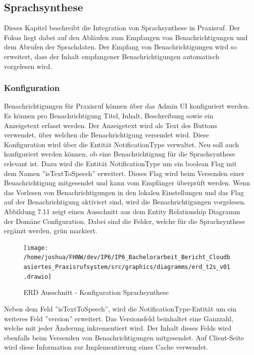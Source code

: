 \subsection{Sprachsynthese}

Dieses Kapitel beschreibt die Integration von Sprachsynthese in Praxisruf.
Der Fokus liegt dabei auf den Abläufen zum Empfangen von Benachrichtigungen und dem Abrufen der Sprachdaten.
Der Empfang von Benachrichtigungen wird so erweitert, dass der Inhalt empfangener Benachrichtigungen automatisch vorgelesen wird.

\subsubsection{Konfiguration}

Benachrichtigungen für Praxisruf können über das Admin UI konfiguriert werden.
Es können pro Benachrichtigung Titel, Inhalt, Beschreibung sowie ein Anzeigetext erfasst werden.
Der Anzeigetext wird als Text des Buttons verwendet, über welchen die Benachrichtigung versendet wird.
Diese Konfiguration wird über die Entität NotificationType verwaltet.
Neu soll auch konfiguriert werden können, ob eine Benachrichtigung für die Sprachsynthese relevant ist.
Dazu wird die Entität NotificationType um ein boolean Flag mit dem Namen ''isTextToSpeech'' erweitert.
Dieses Flag wird beim Versenden einer Benachrichtigung mitgesendet und kann vom Empfänger überprüft werden.
Wenn das Vorlesen von Benachrichtigungen in den lokalen Einstellungen und das Flag auf der Benachrichtigung aktiviert sind, wird die Benachrichtigungen vorgelesen.
Abbildung 7.11 zeigt einen Ausschnitt aus dem Entity Relationship Diagramm der Domäne Configuration.
Dabei sind die Felder, welche für die Sprachsynthese ergänzt werden, grün markiert.

\begin{figure}[h]
    \centering
    \begin{minipage}[b]{0.6\textwidth}
        \texttt{[image: /home/joshua/FHNW/dev/IP6/IP6\_Bachelorarbeit\_Bericht\_Cloudbasiertes\_Praxisrufsystem/src/graphics/diagramms/erd\_t2s\_v01.drawio]}
        \caption{ERD Ausschnitt - Konfiguration Sprachsynthese}
    \end{minipage}
\end{figure}

Neben dem Feld ''isTextToSpeech'', wird die NotificationType-Entität um ein weiteres Feld ''version'' erweitert.
Das Versionsfeld beinhaltet eine Ganzzahl, welche mit jeder Änderung inkrementiert wird.
Der Inhalt dieses Felds wird ebenfalls beim Versenden von Benachrichtigungen mitgesendet.
Auf Client-Seite wird diese Information zur Implementierung eines Cache verwendet.

